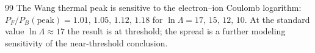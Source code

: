 \documentclass[aip,pop,reprint,amsmath,amssymb,floatfix]{revtex4-2}
\begin{document}
\begin{thebibliography}{99}
 The Wang thermal peak is sensitive to the electron--ion Coulomb logarithm: $P_F/P_B(\mathrm{peak}) = 1.01,\,1.05,\,1.12,\,1.18$ for $\ln\Lambda = 17,\,15,\,12,\,10$. At the standard value $\ln\Lambda \approx 17$ the result is at threshold; the spread is a further modeling sensitivity of the near-threshold conclusion.

\end{thebibliography}
\end{document}
